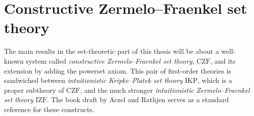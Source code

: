 \documentclass[12pt,openany]{book}
\theoremstyle{plain}
\theoremstyle{definition}
\newcommand\CZF{\mathrm{CZF}}
\newcommand\IKP{\mathrm{IKP}}
\newcommand\IZF{\mathrm{IZF}}
\begin{document}
\section{Constructive Zermelo--Fraenkel set theory}
\label{sec:czf-intro}

The main results in the set-theoretic part of this thesis will be about a well-known system called \emph{constructive Zermelo--Fraenkel set theory}, $\CZF$, and its extension by adding the powerset axiom. This pair of first-order theories is sandwiched between \emph{intuitionistic Kripke--Platek set theory} $\IKP$, which is a proper subtheory of $\CZF$, and the much stronger \emph{intuitionistic Zermelo--Fraenkel set theory} $\IZF$. The book draft \cite{aczel-rathjen10-cst-book} by Aczel and Rathjen serves as a standard reference for these constructs.
\end{document}
